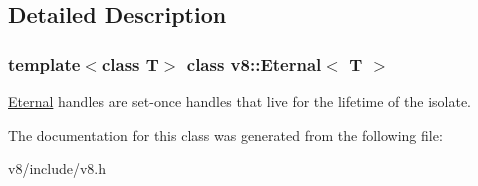 \subsection{Detailed Description}
\subsubsection*{template$<$class T$>$\newline
class v8\+::\+Eternal$<$ T $>$}

\mbox{\hyperlink{classv8_1_1Eternal}{Eternal}} handles are set-\/once handles that live for the lifetime of the isolate. 

The documentation for this class was generated from the following file\+:\begin{DoxyCompactItemize}
\item 
v8/include/v8.\+h\end{DoxyCompactItemize}
